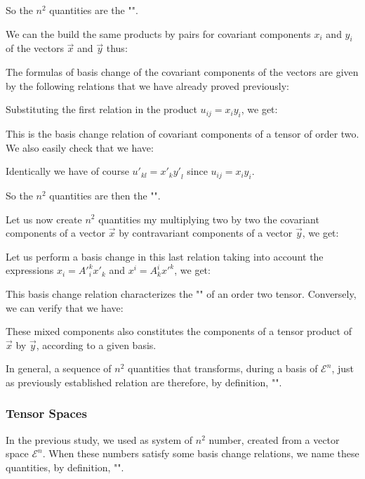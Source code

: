	So the $n^2$ quantities are the "".

	We can the build the same products by pairs for covariant components $x_i$ and $y_i$ of the vectors $\vec{x}$ and $\vec{y}$ thus:
	
	The formulas of basis change of the covariant components of the vectors are given by the following relations that we have already proved previously:
	
	Substituting the first relation in the product $u_{ij}=x_iy_i$, we get:
	
	This is the basis change relation of covariant components of a tensor of order two. We also easily check that we have:
	
	Identically we have of course ${u'}_{kl}={x'}_k{y'}_l$ since $u_{ij}=x_iy_i$.

	So the $n^2$ quantities are then the "".

	Let us now create $n^2$ quantities my multiplying two by two the covariant components of a vector $\vec{x}$ by contravariant components of a vector $\vec{y}$, we get:
	
	Let us perform a basis change in this last relation taking into account the expressions $x_i={A'}_i^k{x'}_k$ and $x^i={A}_k^i {x'}^k$, we get:
	
	This basis change relation characterizes the "" of an order two tensor. Conversely, we can verify that we have:
	
	These mixed components also constitutes the components of a tensor product of $\vec{x}$ by $\vec{y}$, according to a given basis.
	
	In general, a sequence of  $n^2$ quantities that transforms, during a basis of $\mathcal{E}^n$, just as previously established relation are therefore, by definition, "".
	
	\pagebreak
	\subsubsection{Tensor Spaces}
	In the previous study, we used as system of $n^2$ number, created from a vector space $\mathcal{E}^n$. When these numbers satisfy some basis change relations, we name these quantities, by definition, "".

